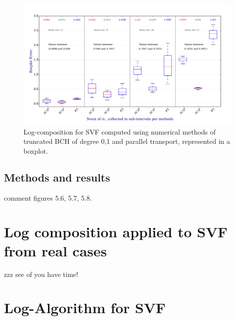 \begin{figure}[!ht]
	\hspace{-2cm}
	\includegraphics[scale=0.6]{figures/SVF_boxplot.png}
	\caption{Log-composition for SVF computed using numerical methods of truncated BCH of degree 0,1 and parallel transport, represented in a boxplot.}
	\label{fig:SVF_boxplot}
\end{figure}










\subsection{Methods and results}


comment figures 5.6, 5.7, 5.8.

\section{Log composition applied to SVF from real cases}

zzz see of you have time!

\section{Log-Algorithm for SVF}


